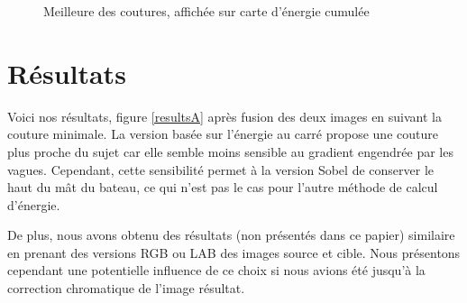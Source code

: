 \documentclass[a4paper]{article}
\begin{document}
\begin{figure}[!ht]%
    \centering
    \hspace{0.030\textwidth}
    \caption{Meilleure des coutures, affichée sur carte d'énergie cumulée}
    \label{bestseam}
\end{figure}
\section{Résultats}



Voici nos résultats, figure \ref{resultsA} après fusion des deux images en suivant la couture minimale. La  version basée sur l'énergie au carré propose une couture plus proche du sujet car elle semble moins sensible au gradient engendrée par les vagues.  Cependant, cette sensibilité permet à la version Sobel de conserver le haut du mât du bateau, ce qui n'est pas le cas pour l'autre méthode de calcul d'énergie.

De plus, nous avons obtenu des résultats (non présentés dans ce papier) similaire en prenant des versions RGB ou LAB des images source et cible. Nous présentons cependant une potentielle influence de ce choix si nous avions été jusqu'à la correction chromatique de l'image résultat.
\end{document}
